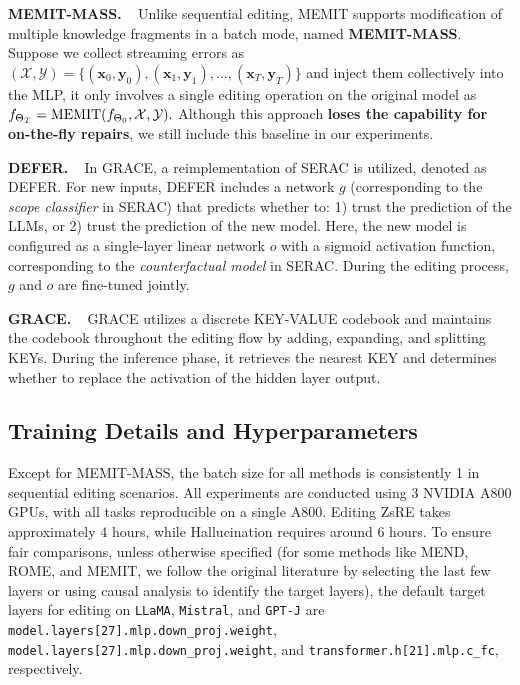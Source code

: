 \textbf{MEMIT-MASS.} ~
Unlike sequential editing, MEMIT supports modification of multiple knowledge fragments in a batch mode, named \textbf{MEMIT-MASS}.
Suppose we collect streaming errors as $(\mathcal{X}, \mathcal{Y}) = \{(\mathbf{x}_0, \mathbf{y}_0), (\mathbf{x}_1, \mathbf{y}_1), ..., (\mathbf{x}_T, \mathbf{y}_T)\}$ and inject them collectively into the MLP, it only involves a single editing operation on the original model as $f_{\Theta_{T}} = {\rm MEMIT}(f_{\Theta_{0}}, \mathcal{X}, \mathcal{Y}).$
Although this approach \textbf{loses the capability for on-the-fly repairs}, we still include this baseline in our experiments.

\textbf{DEFER.} ~
In GRACE, a reimplementation of SERAC \cite{serac} is utilized, denoted as DEFER.
For new inputs, DEFER includes a network $g$ (corresponding to the \textit{scope classifier} in SERAC) that predicts whether to: 1) trust the prediction of the LLMs, or 2) trust the prediction of the new model.
Here, the new model is configured as a single-layer linear network $o$ with a sigmoid activation function, corresponding to the \textit{counterfactual model} in SERAC.
During the editing process, $g$ and $o$ are fine-tuned jointly.

\textbf{GRACE.} ~
GRACE \cite{grace} utilizes a discrete KEY-VALUE codebook and maintains the codebook throughout the editing flow by adding, expanding, and splitting KEYs.
During the inference phase, it retrieves the nearest KEY and determines whether to replace the activation of the hidden layer output.

\subsection{Training Details and Hyperparameters} \label{app_sec: training_details}
Except for MEMIT-MASS, the batch size for all methods is consistently 1 in sequential editing scenarios.
All experiments are conducted using 3 NVIDIA A800 GPUs, with all tasks reproducible on a single A800.
Editing ZsRE takes approximately 4 hours, while Hallucination requires around 6 hours.
To ensure fair comparisons, unless otherwise specified (for some methods like MEND, ROME, and MEMIT, we follow the original literature by selecting the last few layers or using causal analysis to identify the target layers), the default target layers for editing on \texttt{LLaMA}, \texttt{Mistral}, and \texttt{GPT-J} are \texttt{model.layers[27].mlp.down\_proj.weight}, \texttt{model.layers[27].mlp.down\_proj.weight}, and \texttt{transformer.h[21].mlp.c\_fc}, respectively.

